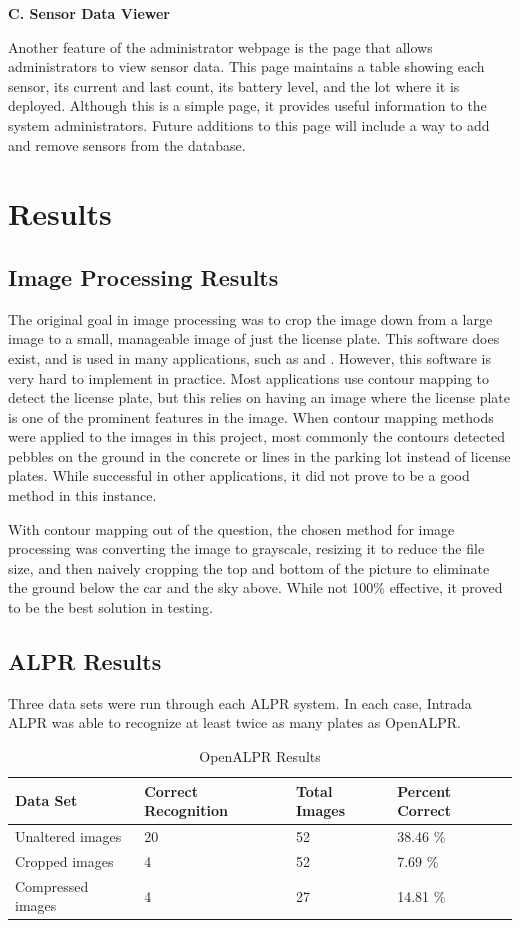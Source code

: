 \documentclass[11pt, oneside, fullpage, doublespace]{article}
\begin{document}
\textbf{C. Sensor Data Viewer}

Another feature of the administrator webpage is the page that allows administrators to view sensor data. This page maintains a table showing each sensor, its current and last count, its battery level, and the lot where it is deployed. Although this is a simple page, it provides useful information to the system administrators. Future additions to this page will include a way to add and remove sensors from the database.

\section{Results}

\subsection{Image Processing Results}

The original goal in image processing was to crop the image down from a large image to a small, manageable image of just the license plate. This software does exist, and is used in many applications, such as \cite{du2013} and \cite{e470}. However, this software is very hard to implement in practice. Most applications use contour mapping to detect the license plate, but this relies on having an image where the license plate is one of the prominent features in the image. When contour mapping methods were applied to the images in this project, most commonly the contours detected pebbles on the ground in the concrete or lines in the parking lot instead of license plates. While successful in other applications, it did not prove to be a good method in this instance.

With contour mapping out of the question, the chosen method for image processing was converting the image to grayscale, resizing it to reduce the file size, and then naively cropping the top and bottom of the picture to eliminate the ground below the car and the sky above. While not 100\% effective, it proved to be the best solution in testing.

\subsection{ALPR Results}
Three data sets were run through each ALPR system. In each case, Intrada ALPR was able to recognize at least twice as many plates as OpenALPR.


\begin{table}[h!]
\begin{center}
\begin{tabular}{| l || l | l | l |}
\hline
Data Set & Correct Recognition & Total Images & Percent Correct \\ \hline
Unaltered images & 20 & 52 & 38.46 \% \\ \hline
Cropped images & 4 & 52 & 7.69 \% \\ \hline
Compressed images & 4 & 27 & 14.81 \% \\ \hline
\end{tabular}
\end{center}
\caption{OpenALPR Results}
\label{tab:openalprresults}
\end{table}
\end{document}
